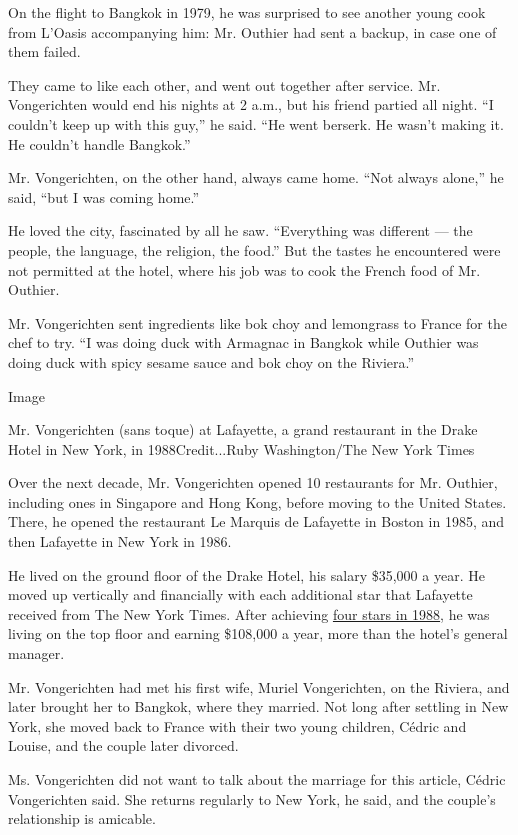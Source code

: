 On the flight to Bangkok in 1979, he was surprised to see another young
cook from L'Oasis accompanying him: Mr. Outhier had sent a backup, in
case one of them failed.

They came to like each other, and went out together after service. Mr.
Vongerichten would end his nights at 2 a.m., but his friend partied all
night. ``I couldn't keep up with this guy,'' he said. ``He went berserk.
He wasn't making it. He couldn't handle Bangkok.''

Mr. Vongerichten, on the other hand, always came home. ``Not always
alone,'' he said, ``but I was coming home.''

He loved the city, fascinated by all he saw. ``Everything was different
--- the people, the language, the religion, the food.'' But the tastes
he encountered were not permitted at the hotel, where his job was to
cook the French food of Mr. Outhier.

Mr. Vongerichten sent ingredients like bok choy and lemongrass to France
for the chef to try. ``I was doing duck with Armagnac in Bangkok while
Outhier was doing duck with spicy sesame sauce and bok choy on the
Riviera.''

Image

Mr. Vongerichten (sans toque) at Lafayette, a grand restaurant in the
Drake Hotel in New York, in 1988Credit...Ruby Washington/The New York
Times

Over the next decade, Mr. Vongerichten opened 10 restaurants for Mr.
Outhier, including ones in Singapore and Hong Kong, before moving to the
United States. There, he opened the restaurant Le Marquis de Lafayette
in Boston in 1985, and then Lafayette in New York in 1986.

He lived on the ground floor of the Drake Hotel, his salary \$35,000 a
year. He moved up vertically and financially with each additional star
that Lafayette received from The New York Times. After achieving
\href{https://www.nytimes3xbfgragh.onion/1988/04/22/arts/restaurants-067888.html}{four
stars in 1988}, he was living on the top floor and earning \$108,000 a
year, more than the hotel's general manager.

Mr. Vongerichten had met his first wife, Muriel Vongerichten, on the
Riviera, and later brought her to Bangkok, where they married. Not long
after settling in New York, she moved back to France with their two
young children, Cédric and Louise, and the couple later divorced.

Ms. Vongerichten did not want to talk about the marriage for this
article, Cédric Vongerichten said. She returns regularly to New York, he
said, and the couple's relationship is amicable.

